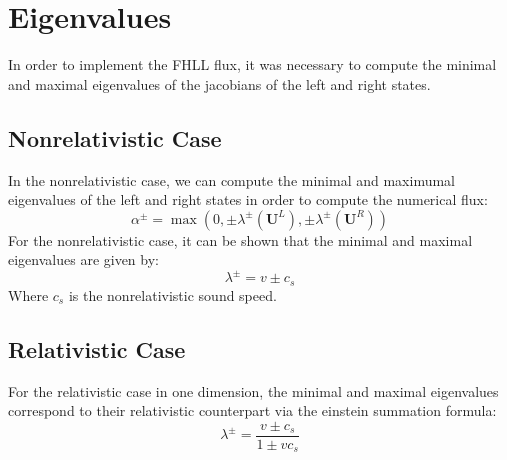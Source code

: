 \section{Eigenvalues}
In order to implement the FHLL flux, it was necessary to compute the minimal and maximal eigenvalues of the jacobians of the left and right states. 
\subsection{Nonrelativistic Case}
In the nonrelativistic case, we can compute the minimal and maximumal eigenvalues of the left and right states in order to compute the numerical flux:
$$\alpha^{\pm}=\max(0,\pm\lambda^{\pm}(\bm{U}^L),\pm\lambda^{\pm}(\bm{U}^R))$$
For the nonrelativistic case, it can be shown that the minimal and maximal eigenvalues are given by:
$$\lambda^{\pm}=v\pm c_s$$
Where $c_s$ is the nonrelativistic sound speed. 
\subsection{Relativistic Case}
For the relativistic case in one dimension, the minimal and maximal eigenvalues correspond to their relativistic counterpart via the einstein summation formula:
$$\lambda^{\pm}=\frac{v\pm c_s}{1\pm v c_s}$$

